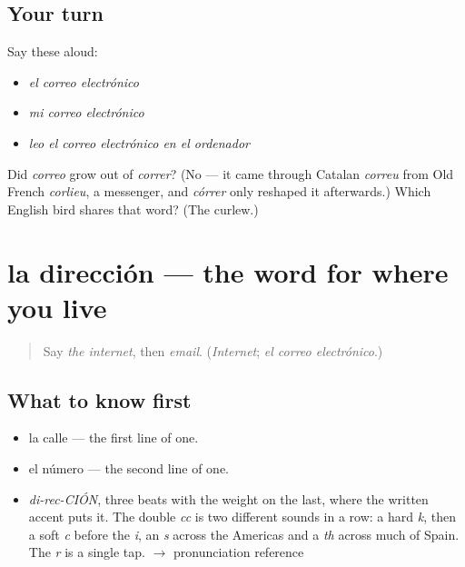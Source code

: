 \subsection*{Your turn}
Say these aloud:

\begin{itemize}
\raggedright
  \item \emph{el correo electrónico}
  \item \emph{mi correo electrónico}
  \item \emph{leo el correo electrónico en el ordenador}
\end{itemize}

\begin{tcolorbox}[breakable,colback=teal!4,colframe=teal!35!black,title={Before you move on}]
Did \emph{correo} grow out of \emph{correr}? (No — it came through Catalan \emph{correu} from Old French \emph{corlieu}, a messenger, and \emph{córrer} only reshaped it afterwards.) Which English bird shares that word? (The curlew.)
\end{tcolorbox}
\section[la dirección]{la dirección — the word for where you live}

\label{lesson:ES-C393-direccion}



\begin{quote}
Say \emph{the internet}, then \emph{email}. (\emph{Internet}; \emph{el correo electrónico}.)
\end{quote}

\subsection*{What to know first}
\begin{itemize}
\raggedright
  \item la calle — the first line of one.
  \item el número — the second line of one.
\end{itemize}

\begin{sounds}
\begin{itemize}
\raggedright
  \item \emph{di-rec-CIÓN}, three beats with the weight on the last, where the written accent puts it. The double \emph{cc} is two different sounds in a row: a hard \emph{k}, then a soft \emph{c} before the \emph{i}, an \emph{s} across the Americas and a \emph{th} across much of Spain. The \emph{r} is a single tap. $\to$ pronunciation reference
\end{itemize}
\end{sounds}

